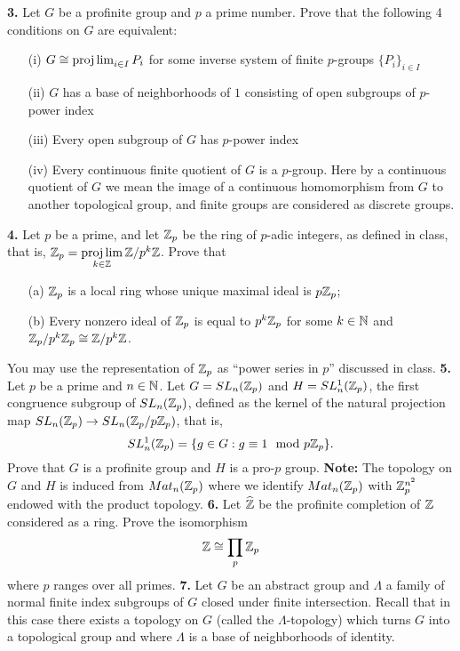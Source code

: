 \documentclass[12pt]{amsart}
\begin{document}
{\bf 3.} Let $G$ be a profinite group and $p$ a prime number. Prove that the following 4 conditions on $G$ are equivalent:
\begin{itemize}
\item[(i)] $G\cong \projlim_{i\in I}P_i$ for some inverse system of finite $p$-groups $\{P_i\}_{i\in I}$
\item[(ii)] $G$ has a base of neighborhoods of $1$ consisting of open subgroups of $p$-power index
\item[(iii)] Every open subgroup of $G$ has $p$-power index
\item[(iv)] Every continuous finite quotient of $G$ is a $p$-group. Here by a continuous quotient of $G$ we mean the image of a continuous homomorphism from $G$ to another topological group, and finite groups are considered as discrete groups.
\end{itemize}
\skv
{\bf 4.} Let $p$ be a prime, and let ${\mathbb Z}_p$ be the ring of $p$-adic integers, as defined in class, that is, 
${\mathbb Z}_p=\projlim\limits_{k\in {\mathbb Z}}{\mathbb Z}/p^k{\mathbb Z}$. Prove that
\begin{itemize}
\item[(a)] ${\mathbb Z}_p$ is a local ring whose unique maximal ideal is $p{\mathbb Z}_p$;
\item[(b)] Every nonzero ideal of ${\mathbb Z}_p$ is equal to $p^k{\mathbb Z}_p$ for some $k\in {\mathbb N}$ and ${\mathbb Z}_p/p^k{\mathbb Z}_p\cong {\mathbb Z}/p^k{\mathbb Z}$.
\end{itemize}
You may use the representation of ${\mathbb Z}_p$ as ``power series in $p$'' discussed in class.
\skv
{\bf 5.} Let $p$ be a prime and $n\in{\mathbb N}$. Let $G=SL_n({\mathbb Z}_p)$ and $H=SL_n^1({\mathbb Z}_p)$, the first congruence subgroup of $SL_n({\mathbb Z}_p)$,
defined as the kernel of the natural projection map $SL_n({\mathbb Z}_p)\to SL_n({\mathbb Z}_p/p{\mathbb Z}_p)$, that is,
$$SL_n^1({\mathbb Z}_p)=\{g\in G : g\equiv 1\mod p{\mathbb Z}_p\}.$$ Prove that $G$ is a profinite group and $H$ is a pro-$p$ group.
\skv
{\bf Note:} The topology on $G$ and $H$ is induced from $Mat_{n}({\mathbb Z}_p)$ where we identify $Mat_{n}({\mathbb Z}_p)$ with ${\mathbb Z}_p^{n^2}$
endowed with the product topology.
\skv
{\bf 6.} Let $\widehat{{\mathbb Z}}$ be the profinite completion of ${\mathbb Z}$ considered as a ring. Prove the isomorphism
$${\mathbb Z}\cong \prod_{p}{\mathbb Z}_p$$
where $p$ ranges over all primes.
\skv
{\bf 7.} Let $G$ be an abstract group and $\Lambda$ a family of normal finite index subgroups of $G$ closed under finite intersection.
Recall that in this case there exists a topology on $G$ (called the $\Lambda$-topology) which turns $G$ into a topological group and where
$\Lambda$ is a base of neighborhoods of identity.
\end{document}
